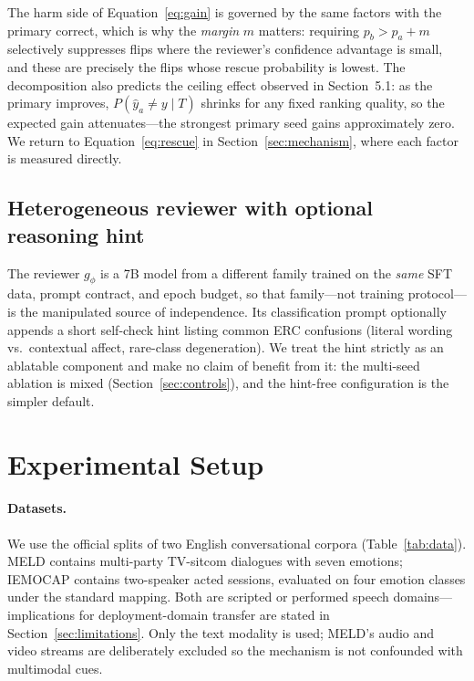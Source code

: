 \documentclass[final,5p,times,twocolumn]{elsarticle}
\begin{document}
\noindent The harm side of Equation~\eqref{eq:gain} is governed by the same
factors with the primary correct, which is why the \emph{margin} $m$
matters: requiring $p_b>p_a+m$ selectively suppresses flips where the
reviewer's confidence advantage is small, and these are precisely the flips
whose rescue probability is lowest. The decomposition also predicts the
ceiling effect observed in Section~5.1: as the primary improves,
$P(\hat y_a\neq y\mid T)$ shrinks for any fixed ranking quality, so the
expected gain attenuates---the strongest primary seed gains approximately
zero. We return to Equation~\eqref{eq:rescue} in
Section~\ref{sec:mechanism}, where each factor is measured directly.

\subsection{Heterogeneous reviewer with optional reasoning hint}
The reviewer $g_\phi$ is a 7B model from a different family trained on the
\emph{same} SFT data, prompt contract, and epoch budget, so that family---not
training protocol---is the manipulated source of independence. Its
classification prompt optionally appends a short self-check hint listing
common ERC confusions (literal wording vs.\ contextual affect, rare-class
degeneration). We treat the hint strictly as an ablatable component and make
no claim of benefit from it: the multi-seed ablation is mixed
(Section~\ref{sec:controls}), and the hint-free configuration is the simpler
default.

\section{Experimental Setup}
\label{sec:setup}
\paragraph{Datasets.}
We use the official splits of two English conversational corpora
(Table~\ref{tab:data}). MELD \citep{poria2019meld} contains multi-party
TV-sitcom dialogues with seven emotions; IEMOCAP \citep{busso2008iemocap}
contains two-speaker acted sessions, evaluated on four emotion classes under
the standard mapping. Both are scripted or performed speech
domains---implications for deployment-domain transfer are stated in
Section~\ref{sec:limitations}. Only the text modality is used; MELD's audio
and video streams are deliberately excluded so the mechanism is not
confounded with multimodal cues.
\end{document}
